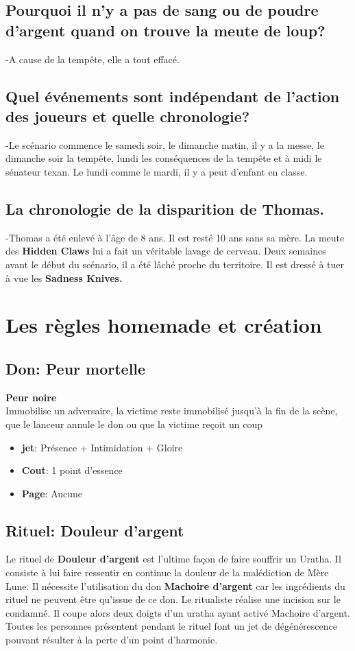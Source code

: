 \documentclass[oneside,12pt]{book}
\newcommand\don[5]{
\textbf{#1} \\
#2
\begin{itemize}
\item{ \textbf{jet}: #3}
\item{ \textbf{Cout}: #4}
\item{ \textbf{Page}: #5}
\end{itemize}
\vspace{0.5cm}
}
\begin{document}
\begin{flushleft}
\subsection{Pourquoi il n'y a pas de sang ou de poudre d'argent quand on trouve la meute de loup?}
-A cause de la tempête, elle a tout effacé. 
\subsection{Quel événements sont indépendant de l'action des joueurs et quelle chronologie?}
-Le scénario commence le samedi soir, le dimanche matin, il y a la messe, le dimanche soir la tempête, lundi les conséquences de la tempête et à midi le sénateur texan. Le lundi comme le mardi, il y a peut d'enfant en classe. 
\subsection{La chronologie de la disparition de Thomas.} 
-Thomas a été enlevé à l'âge de 8 ans. Il est resté 10 ans sans sa mère. La meute des \textbf{Hidden Claws} lui a fait un véritable lavage de cerveau. Deux semaines avant le début du scénario, il a été lâché proche du territoire. Il est dressé à tuer à vue les \textbf{Sadness Knives.}

\clearpage

\section{Les règles homemade et création}
\subsection{Don: Peur mortelle}
\label{Peur_mortelle}
\don{Peur noire}{Immobilise un adversaire, la victime reste immobilisé jusqu'à la fin de la scène, que le lanceur annule le don ou que la victime reçoit un coup}{Présence + Intimidation + Gloire}{1 point d'essence}{Aucune}
\subsection{Rituel: Douleur d'argent}
Le rituel de \textbf{Douleur d'argent} est l'ultime façon de faire souffrir un Uratha. Il consiste à lui faire ressentir en continue la douleur de la malédiction de Mère Lune.
Il nécessite l'utilisation du don \textbf{Machoire d'argent} car les ingrédients du rituel ne peuvent être qu'issue de ce don. Le ritualiste réalise une incision sur le condamné. Il coupe alors deux doigts d'un uratha ayant activé {Machoire d'argent}. Toutes les personnes présentent pendant le rituel font un jet de dégénérescence pouvant résulter à la perte d'un point d'harmonie.

\end{flushleft}
\end{document}

